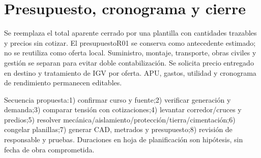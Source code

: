 \setcounter{section}{7}
\section{Presupuesto, cronograma y cierre}
Se reemplaza el total aparente cerrado por una plantilla con cantidades trazables y precios sin cotizar. El presupuestoR01 se conserva como antecedente estimado; no se reutiliza como oferta local. Suministro, montaje, transporte, obras civiles y gestión se separan para evitar doble contabilización. Se solicita precio entregado en destino y tratamiento de IGV por oferta. APU, gastos, utilidad y cronograma de rendimiento permanecen editables.

Secuencia propuesta:1) confirmar curso y fuente;2) verificar generación y demanda;3) comparar tensión con cotizaciones;4) levantar corredor/cruces y predios;5) resolver mecánica/aislamiento/protección/tierra/cimentación;6) congelar planillas;7) generar CAD, metrados y presupuesto;8) revisión de responsable y pruebas. Duraciones en hoja de planificación son hipótesis, sin fecha de obra comprometida.

